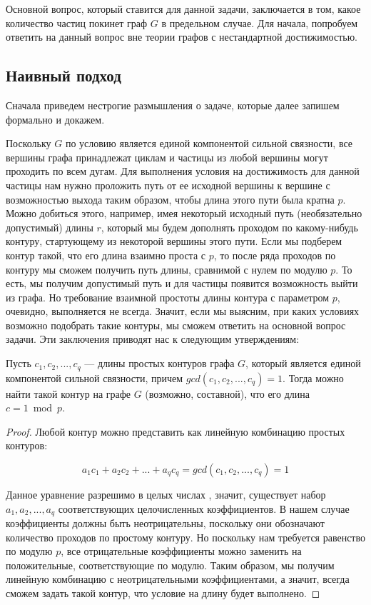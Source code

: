 Основной вопрос, который ставится для данной задачи, заключается в том, какое количество частиц покинет граф $G$ в предельном случае. Для начала, попробуем ответить на данный вопрос вне теории графов с нестандартной достижимостью. 

\subsection{Наивный подход}

Сначала приведем нестрогие размышления о задаче, которые далее запишем формально и докажем. 

Поскольку $G$ по условию является единой компонентой сильной связности, все вершины графа принадлежат циклам и частицы из любой вершины могут проходить по всем дугам. Для выполнения условия на достижимость для данной частицы нам нужно проложить путь от ее исходной вершины к вершине с возможностью выхода таким образом, чтобы длина этого пути была кратна $p$. Можно добиться этого, например, имея некоторый исходный путь (необязательно допустимый) длины $r$, который мы будем дополнять проходом по какому-нибудь контуру, стартующему из некоторой вершины этого пути. Если мы подберем контур такой, что его длина взаимно проста с $p$, то после ряда проходов по контуру мы сможем получить путь длины, сравнимой с нулем по модулю $p$. То есть, мы получим допустимый путь и для частицы появится возможность выйти из графа. Но требование взаимной простоты длины контура с параметром $p$, очевидно, выполняется не всегда. Значит, если мы выясним, при каких условиях возможно подобрать такие контуры, мы сможем ответить на основной вопрос задачи. Эти заключения приводят нас к следующим утверждениям:

\begin{lemma}
	Пусть $c_1, c_2, ... , c_q $ --- длины простых контуров графа $G$, который является единой компонентой сильной связности, причем $gcd(c_1, c_2, ... , c_q) = 1$. Тогда можно найти такой контур на графе $G$ (возможно, составной), что его длина $c = 1\bmod p$.
\end{lemma}

\begin{proof}
	Любой контур можно представить как линейную комбинацию простых контуров: 
	
	\begin{equation*}
	a_1c_1 + a_2c_2 + ... + a_qc_q = gcd(c_1, c_2, ... , c_q) = 1
	\end{equation*}
	
	Данное уравнение разрешимо в целых числах \cite{Hasse}, значит, существует набор $a_1, a_2, ... , a_q$ соответствующих целочисленных коэффициентов. В нашем случае коэффициенты должны быть неотрицательны, поскольку они обозначают количество проходов по простому контуру. Но поскольку нам требуется равенство по модулю $p$, все отрицательные коэффициенты можно заменить на положительные, соответствующие по модулю. Таким образом, мы получим линейную комбинацию с неотрицательными коэффициентами, а значит, всегда сможем задать такой контур, что условие на длину будет выполнено. 
\end{proof}

